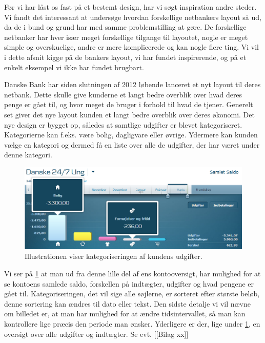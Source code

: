Før vi har låst os fast på et bestemt design, har vi søgt inspiration andre steder. Vi fandt det interessant at undersøge hvordan forskellige netbankers layout så ud, da de i bund og grund har med samme problemstilling at gøre. De forskellige netbanker har hver især meget forskellige tilgange til layoutet, nogle er meget simple og overskuelige, andre er mere komplicerede og kan nogle flere ting. Vi vil i dette afsnit kigge på de bankers layout, vi har fundet inspirerende, og på et enkelt eksempel vi ikke har fundet brugbart.

Danske Bank har siden slutningen af 2012 løbende lanceret et nyt layout til deres netbank\cite{Danskebank}. Dette skulle give kunderne et langt bedre overblik over hvad deres penge er gået til, og hvor meget de bruger i forhold til hvad de tjener. Generelt set giver det nye layout kunden et langt bedre overblik over deres økonomi. Det nye design er bygget op, således at samtlige udgifter er blevet kategoriseret. Kategorierne kan f.eks. være bolig, dagligvare eller øvrige. Ydermere kan kunden vælge en kategori og dermed få en liste over alle de udgifter, der har været under denne kategori. 

\begin{figure}[h!]
\centering
\includegraphics[width=1.0\textwidth]{Billeder/DanskeB.png}
\caption{ Illustrationen viser kategoriseringen af kundens udgifter.}
\label{DanskeB}
\end{figure}

Vi ser på \ref{DanskeB} at man ud fra denne lille del af ens kontooversigt, har mulighed for at se kontoens samlede saldo, forskellen på indtægter, udgifter og hvad pengene er gået til. Kategoriseringen, det vil sige alle søjlerne, er sorteret efter største beløb, denne sortering kan ændres til dato eller tekst. Den sidste detalje vi vil nævne om billedet er, at man har mulighed for at ændre tidsintervallet, så man kan kontrollere lige præcis den periode man ønsker. Yderligere er der, lige under \ref{DanskeB}, en oversigt over alle udgifter og indtægter. Se evt. [[Bilag xx]]

